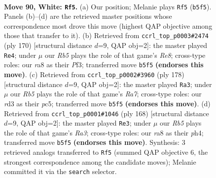 \documentclass[11pt]{article}
\begin{document}
\clearpage

\begin{figure}[p]\centering
\begin{subfigure}{0.46\textwidth}\centering
\resizebox{\linewidth}{!}{%
\newchessgame
\chessboard[
  setfen={r7/2k5/8/1R4K1/7P/3r4/8/8 w - - 21 90},
  showmover=false,
  pgfstyle=straightmove, color=movearrow, markmove={b5-f5}
]}
\caption{}
\end{subfigure}\hfill
\begin{subfigure}{0.46\textwidth}\centering
\resizebox{\linewidth}{!}{%
\newchessgame
\chessboard[
  setfen={4R3/8/5k2/6p1/8/4KP2/r7/8 w - - 8 86},
  showmover=false,
  pgfstyle=straightmove, color=movearrow, markmove={e8-e4}
]}
\caption{}
\end{subfigure}
\\[4pt]
\begin{subfigure}{0.46\textwidth}\centering
\resizebox{\linewidth}{!}{%
\newchessgame
\chessboard[
  setfen={5r2/R7/2k5/2p5/8/1P6/K7/8 w - - 3 90},
  showmover=false,
  pgfstyle=straightmove, color=movearrow, markmove={a7-a3}
]}
\caption{}
\end{subfigure}\hfill
\begin{subfigure}{0.46\textwidth}\centering
\resizebox{\linewidth}{!}{%
\newchessgame
\chessboard[
  setfen={8/4k3/8/4r3/7p/R4K2/6P1/8 w - - 4 85},
  showmover=false,
  pgfstyle=straightmove, color=movearrow, markmove={a3-e3}
]}
\caption{}
\end{subfigure}
\caption{\textbf{Move 90, White: \texttt{Rf5}.} (a) Our position; Melanie plays \texttt{Rf5} (\texttt{b5f5}). Panels (b)--(d) are the retrieved master positions whose correspondence most drove this move (highest QAP objective among those that transfer to it). (b) Retrieved from \texttt{ccrl\_top\_p0003\#2474} (ply 170) [structural distance $d$=9, QAP obj=2]: the master played \texttt{Re4}; under $\mu$ our \emph{Rb5} plays the role of that game's \emph{Re8}; cross-type roles: our \emph{r}a8 as their \emph{P}f3; transferred move \texttt{b5f5} \textbf{(endorses this move)}. (c) Retrieved from \texttt{ccrl\_top\_p0002\#3960} (ply 178) [structural distance $d$=9, QAP obj=2]: the master played \texttt{Ra3}; under $\mu$ our \emph{Rb5} plays the role of that game's \emph{Ra7}; cross-type roles: our \emph{r}d3 as their \emph{p}c5; transferred move \texttt{b5f5} \textbf{(endorses this move)}. (d) Retrieved from \texttt{ccrl\_top\_p0001\#1046} (ply 168) [structural distance $d$=9, QAP obj=2]: the master played \texttt{Re3}; under $\mu$ our \emph{Rb5} plays the role of that game's \emph{Ra3}; cross-type roles: our \emph{r}a8 as their \emph{p}h4; transferred move \texttt{b5f5} \textbf{(endorses this move)}. Synthesis: 3 retrieved analogs transferred to \texttt{Rf5} (summed QAP objective 6, the strongest correspondence among the candidate moves); Melanie committed it via the \texttt{search} selector.}
\label{fig:thought-m178}
\end{figure}
\end{document}
